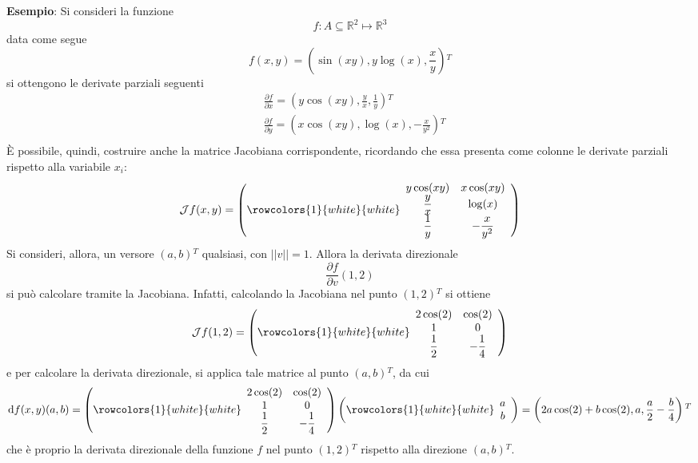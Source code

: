 \documentclass[a4paper]{extarticle}
\newcommand*\dif{\mathop{}\!\mathrm{d}}
\begin{document}
\vspace{1em}
\noindent
\textbf{Esempio}: Si consideri la funzione
\[f : A \subseteq \mathbb{R}^2 \longmapsto \mathbb{R}^3\]
data come segue
\[f(x,y)=\left(\sin(xy),y \log(x),\frac{x}{y}\right){^T}\]
si ottengono le derivate parziali seguenti
\begin{align*}
    &\frac{\partial f}{\partial x} = \left(y\cos(xy),\frac{y}{x},\frac{1}{y}\right){^T}\\
    &\frac{\partial f}{\partial y} = \left(x\cos(xy),\log(x),-\frac{x}{y^2}\right){^T}\\
\end{align*}
È possibile, quindi, costruire anche la matrice Jacobiana corrispondente, ricordando che essa presenta come colonne le derivate parziali rispetto alla variabile $x_i$:
\[\mathcal{J} f(x,y) = \left(
    \rowcolors{1}{white}{white}
    \begin{array}{cc}
        y \cos(xy)   & x \cos(xy)\\
        \dfrac{y}{x} & \log(x)\\
        \dfrac{1}{y} & -\dfrac{x}{y^2}\\
    \end{array}
\right)\]
Si consideri, allora, un versore $(a,b){^T}$ qualsiasi, con $\vert\vert v \vert\vert=1$. Allora la derivata direzionale
\[\dfrac{\partial f}{\partial v}(1,2)\]
si può calcolare tramite la Jacobiana. Infatti, calcolando la Jacobiana nel punto $(1,2){^T}$ si ottiene
\[\mathcal{J} f(1,2) = \left(
    \rowcolors{1}{white}{white}
    \begin{array}{cc}
        2 \cos(2)    & \cos(2)\\
        1            & 0\\
        \dfrac{1}{2} & -\dfrac{1}{4}\\
    \end{array}
\right)\]
e per calcolare la derivata direzionale, si applica tale matrice al punto $(a,b){^T}$, da cui
\[
    \dif f(x,y)(a,b) = \left(
        \rowcolors{1}{white}{white}
        \begin{array}{cc}
            2 \cos(2)    & \cos(2)\\
            1            & 0\\
            \dfrac{1}{2} & -\dfrac{1}{4}\\
        \end{array}
    \right) \left(
        \rowcolors{1}{white}{white}
        \begin{array}{cc}
            a\\
            b
        \end{array}
    \right) = \left(2a \cos(2) + b \cos(2), a, \dfrac{a}{2} - \dfrac{b}{4}\right){^T}
\]
che è proprio la derivata direzionale della funzione $f$ nel punto $(1,2){^T}$ rispetto alla direzione $(a,b){^T}$.
\end{document}

